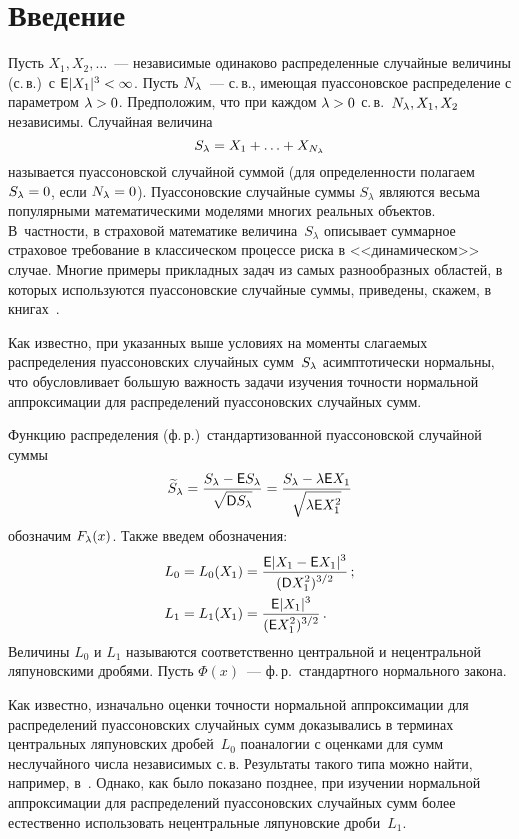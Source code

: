       \begin{multicols}{2}
      
            \label{st\stat}


\section{Введение}

Пусть $X_1,X_2,\ldots$~--- независимые одинаково распределенные
случайные величины (с.\,в.)~с $\e|X_1|^3\hm <\infty$. Пусть $N_\lambda$~---
с.\,в., имеющая пуассоновское распределение с параметром $\lambda>0$.
Предположим, что при каждом $\lambda\hm>0$ с.\,в.\ $N_\lambda,X_1,X_2$
независимы. Случайная величина
\begin{equation*}
S_\lambda = X_1+\ldots+X_{N_\lambda}
\end{equation*}
называется пуассоновской случайной суммой (для определенности
полагаем $S_\lambda=0$, если $N_\lambda=0$). Пуассоновские случайные суммы
$S_{\lambda}$ являются весьма популярными математическими моделями
многих реальных объектов. В~частности, в страховой математике
величина~$S_{\lambda}$ описывает суммарное страховое требование в
классическом процессе риска в <<динамическом>> случае. Многие примеры
прикладных задач из самых разнообразных областей, в которых
используются пуассоновские случайные суммы, приведены, скажем, в
книгах~\cite{GnedenkoKorolev1996, BeningKorolev2002}.

Как известно, при указанных выше условиях на моменты слагаемых
распределения пуассоновских случайных сумм~$S_\lambda$ асимптотически
нормальны, что обусловливает большую важность задачи изуче\-ния
точности нормальной аппроксимации для распределений пуассоновских
случайных сумм.

Функцию распределения (ф.\,р.)\ стан\-дар\-ти\-зо\-ван\-ной пуассоновской
случайной суммы
\begin{equation*}
\widetilde S_\lambda=\displaystyle\frac{\displaystyle S_\lambda-{\sf E} S_\lambda\mathstrut}{\displaystyle \sqrt{{\sf D} S_\lambda}\mathstrut}=
\displaystyle\frac{\displaystyle S_\lambda- \lambda{\sf E} X_1\mathstrut}{\displaystyle \sqrt{\lambda{\sf E} X_1^2}\mathstrut}
\end{equation*}
обозначим $F_\lambda(x)$. Также введем обозначения:
\begin{align*}
L_0&=L_0(X_1)=\displaystyle\frac{\displaystyle {\sf E}|X_1-{\sf E} X_1|^3\mathstrut}{\displaystyle ({\sf D} X_1^2)^{3/2}\mathstrut}\,;\\
L_1&=L_1(X_1)=\displaystyle\frac{\displaystyle {\sf E}|X_1|^3\mathstrut}{\displaystyle ({\sf E} X_1^2)^{3/2}\mathstrut}\,.
\end{align*}
Величины $L_0$ и $L_1$ называются соответственно центральной и
нецентральной ляпуновскими дробями. Пусть $\Phi(x)$~--- ф.\,р.\
стандартного нормального закона.

Как известно, изначально оценки точности нормальной аппроксимации для
распределений пуассоновских случайных сумм доказывались в терминах
центральных ляпуновских дробей~$L_0$ по\linebreak аналогии с оценками для сумм
неслучайного числа независимых с.\,в. Результаты такого типа можно
найти, например, в~\cite{KruglovKorolev1990}. Однако, как было
показано позднее, при изучении нормальной аппроксимации для
распределений пуассоновских случайных сумм более естественно
использовать нецентральные ляпуновские дроби~$L_1$.


\end{multicols}
